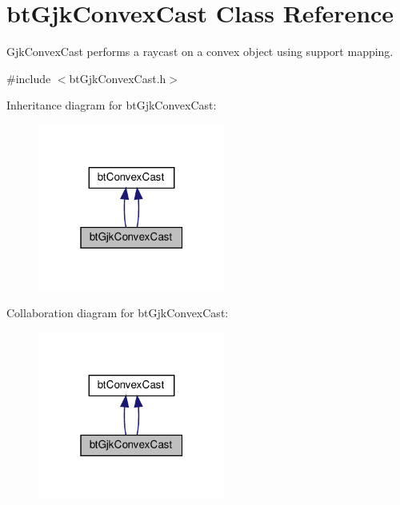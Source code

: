 \hypertarget{classbtGjkConvexCast}{}\section{bt\+Gjk\+Convex\+Cast Class Reference}
\label{classbtGjkConvexCast}


Gjk\+Convex\+Cast performs a raycast on a convex object using support mapping.  




{\ttfamily \#include $<$bt\+Gjk\+Convex\+Cast.\+h$>$}



Inheritance diagram for bt\+Gjk\+Convex\+Cast\+:
\nopagebreak
\begin{figure}[H]
\begin{center}
\leavevmode
\includegraphics[width=175pt]{classbtGjkConvexCast__inherit__graph}
\end{center}
\end{figure}


Collaboration diagram for bt\+Gjk\+Convex\+Cast\+:
\nopagebreak
\begin{figure}[H]
\begin{center}
\leavevmode
\includegraphics[width=175pt]{classbtGjkConvexCast__coll__graph}
\end{center}
\end{figure}
